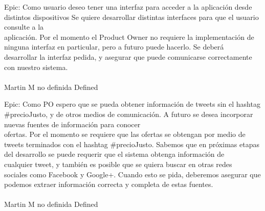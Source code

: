 	{Epic: Como usuario deseo tener una interfaz para acceder a la aplicación desde distintos dispositivos} %
	{Se quiere desarrollar distintas interfaces para que el usuario consulte a la\\
aplicación. Por el momento el Product Owner no requiere la implementación de\\
ninguna interfaz en particular, pero a futuro puede hacerlo. Se deberá\\
desarrollar la interfaz pedida, y asegurar que puede comunicarse correctamente\\
con nuestro sistema.\\
\\
} %
	{} %
	{} %
	{Martin M} %
	{no definida} %
	{Defined} %


\vspace{20pt}

	{Epic: Como PO espero que se pueda obtener información de tweets sin el hashtag #precioJusto, y de otros medios de comunicación.} %
	{A futuro se desea incorporar nuevas fuentes de información para conocer\\
ofertas. Por el momento se requiere que las ofertas se obtengan por medio de\\
tweets terminados con el hashtag #precioJusto. Sabemos que en próximas etapas\\
del desarrollo se puede requerir que el sistema obtenga información de\\
cualquier tweet, y también es posible que se quiera buscar en otras redes\\
sociales como Facebook y Google+. Cuando esto se pida, deberemos asegurar que\\
podemos extraer información correcta y completa de estas fuentes.\\
\\
} %
	{} %
	{} %
	{Martin M} %
	{no definida} %
	{Defined} %


\vspace{20pt}

